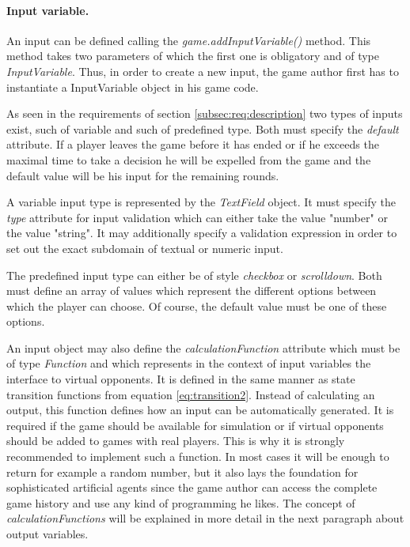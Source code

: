 \paragraph{Input variable.} An input can be defined calling the \textit{game.addInputVariable()} method. This method takes two parameters of which the first one is obligatory and of type \textit{InputVariable}. Thus, in order to create a new input, the game author first has to instantiate a InputVariable object in his game code. 

As seen in the requirements of section \ref{subsec:req:description} two types of inputs exist, such of variable and such of predefined type. Both must specify the \textit{default} attribute. If a player leaves the game before it has ended or if he exceeds the maximal time to take a decision he will be expelled from the game and the default value will be his input for the remaining rounds. 

A variable input type is represented by the \textit{TextField} object. It must specify the \textit{type} attribute for input validation which can either take the value "number" or the value "string". It may additionally specify a validation expression in order to set out the exact subdomain of textual or numeric input.  

The predefined input type can either be of style \textit{checkbox} or \textit{scrolldown}. Both must define an array of values which represent the different options between which the player can choose. Of course, the default value must be one of these options.

An input object may also define the \textit{calculationFunction} attribute which must be of type \textit{Function} and which represents in the context of input variables the interface to virtual opponents. It is defined in the same manner as state transition functions from equation \ref{eq:transition2}. Instead of calculating an output, this function defines how an input can be automatically generated. It is required if the game should be available for simulation or if virtual opponents should be added to games with real players. This is why it is strongly recommended to implement such a function. In most cases it will be enough to return for example a random number, but it also lays the foundation for sophisticated artificial agents since the game author can access the complete game history and use any kind of programming he likes. The concept of \textit{calculationFunctions} will be explained in more detail in the next paragraph about output variables.


